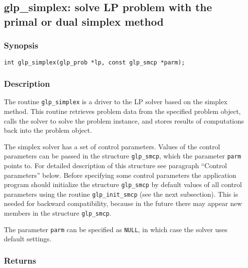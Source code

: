 
\subsection{glp\_simplex: solve LP problem with the primal or dual
simplex method}

\subsubsection*{Synopsis}

\begin{verbatim}
int glp_simplex(glp_prob *lp, const glp_smcp *parm);
\end{verbatim}

\subsubsection*{Description}

The routine \verb|glp_simplex| is a driver to the LP solver based on
the simplex method. This routine retrieves problem data from the
specified problem object, calls the solver to solve the problem
instance, and stores results of computations back into the problem
object.

The simplex solver has a set of control parameters. Values of the
control parameters can be passed in the structure \verb|glp_smcp|,
which the parameter \verb|parm| points to. For detailed description of
this structure see paragraph ``Control parameters'' below.
Before specifying some control parameters the application program
should initialize the structure \verb|glp_smcp| by default values of
all control parameters using the routine \verb|glp_init_smcp| (see the
next subsection). This is needed for backward compatibility, because in
the future there may appear new members in the structure
\verb|glp_smcp|.

The parameter \verb|parm| can be specified as \verb|NULL|, in which
case the solver uses default settings.

\subsubsection*{Returns}

\def\arraystretch{1}

